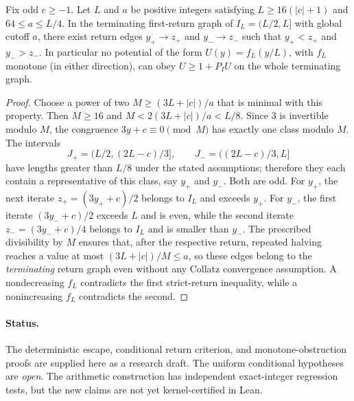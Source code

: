 \begin{proposition}
\label{prop:position-monotone-obstruction-candidate}
Fix odd $c\ge-1$. Let $L$ and $a$ be positive integers satisfying
$L\ge16(|c|+1)$ and $64\le a\le L/4$.
In the terminating first-return graph of $I_L=(L/2,L]$
with global cutoff $a$, there exist return edges
$y_+\to z_+$ and $y_-\to z_-$ such that
$y_+<z_+$ and $y_->z_-$.
In particular no potential of the form $U(y)=f_L(y/L)$, with
$f_L$ monotone (in either direction), can obey
$U\ge1+P_IU$ on the whole terminating graph.
\end{proposition}
\begin{proof}
Choose a power of two $M\ge(3L+|c|)/a$ that is minimal
with this property. Then $M\ge16$ and
$M<2(3L+|c|)/a<L/8$. Since $3$ is invertible modulo
$M$, the congruence $3y+c\equiv0\pmod M$ has exactly one
class modulo $M$. The intervals
\[
 J_+=\bigl(L/2,(2L-c)/3\bigr],\qquad
 J_-=\bigl((2L-c)/3,L\bigr]
\]
have lengths greater than $L/8$ under the stated assumptions;
therefore they each contain a representative of this class,
say $y_+$ and $y_-$. Both are odd.
For $y_+$, the next iterate $z_+=(3y_++c)/2$ belongs to
$I_L$ and exceeds $y_+$. For $y_-$, the first iterate
$(3y_-+c)/2$ exceeds $L$ and is even, while the second iterate
$z_-=(3y_-+c)/4$ belongs to $I_L$ and is smaller than $y_-$.
The prescribed divisibility by $M$ ensures that, after the
respective return, repeated halving reaches a value at most
$(3L+|c|)/M\le a$, so these edges belong to the \emph{terminating}
return graph even without any Collatz convergence assumption.
A nondecreasing $f_L$ contradicts the first strict-return
inequality, while a nonincreasing $f_L$ contradicts the second.
\end{proof}

\paragraph{Status.}
The deterministic escape, conditional return criterion, and
monotone-obstruction proofs are supplied here as a research draft.
The uniform conditional hypotheses are \emph{open}. The arithmetic
construction has independent exact-integer regression tests, but the
new claims are not yet kernel-certified in Lean.
